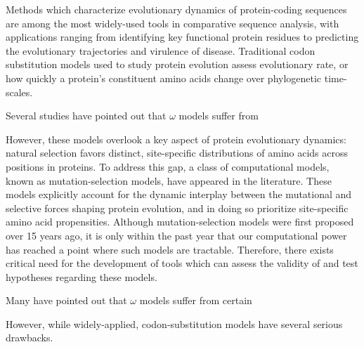 \documentclass[11pt]{article}
\begin{document}
Methods which characterize evolutionary dynamics of protein-coding sequences are among the most widely-used tools in comparative sequence analysis, with applications ranging from identifying key functional protein residues to predicting the evolutionary trajectories and virulence of disease. Traditional codon substitution models used to study protein evolution assess evolutionary rate, or how quickly a protein's constituent amino acids change over phylogenetic time-scales. 

Several studies have pointed out that $\omega$ models suffer from 


However, these models overlook a key aspect of protein evolutionary dynamics: natural selection favors distinct, site-specific distributions of amino acids across positions in proteins. To address this gap, a class of computational models, known as mutation-selection models, have appeared in the literature. These models explicitly account for the dynamic interplay between the mutational and selective forces shaping protein evolution, and in doing so prioritize site-specific amino acid propensities. Although mutation-selection models were first proposed over 15 years ago, it is only within the past year that our computational power has reached a point where such models are tractable. Therefore, there exists critical need for the development of tools which can assess the validity of and test hypotheses regarding these models. 


Many have pointed out that $\omega$ models suffer from certain 

However, while widely-applied, codon-substitution models have several serious drawbacks.


\end{document}

